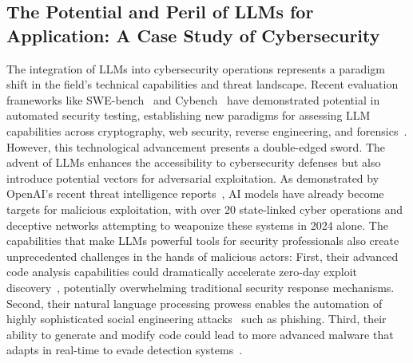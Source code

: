 \subsection{The Potential and Peril of LLMs for Application: A Case Study of Cybersecurity}
The integration of LLMs into cybersecurity operations represents a paradigm shift in the field's technical capabilities and threat landscape. Recent evaluation frameworks like SWE-bench~\cite{jimenez2024swebench} and Cybench~\cite{zhang2024cybench} have demonstrated potential in automated security testing, establishing new paradigms for assessing LLM capabilities across cryptography, web security, reverse engineering, and forensics~\cite{hu2020automated, yang2024whitefox, wang2024llmif, meng2024large, deng2023large, ma2024one, ullah2024llms, aicc2024}. However, this technological advancement presents a double-edged sword. The advent of LLMs enhances the accessibility to cybersecurity defenses but also introduce potential vectors for adversarial exploitation. As demonstrated by OpenAI's recent threat intelligence reports~\cite{openaicybersecurity}, AI models have already become targets for malicious exploitation, with over 20 state-linked cyber operations and deceptive networks attempting to weaponize these systems in 2024 alone. The capabilities that make LLMs powerful tools for security professionals also create unprecedented challenges in the hands of malicious actors: First, their advanced code analysis capabilities could dramatically accelerate zero-day exploit discovery~\cite{fang2024teams, shen2024pentestagent, ristea2024ai}, potentially overwhelming traditional security response mechanisms. Second, their natural language processing prowess enables the automation of highly sophisticated social engineering attacks~\cite{falade2023decoding, charfeddine2024chatgpt} such as phishing. Third, their ability to generate and modify code could lead to more advanced malware that adapts in real-time to evade detection systems~\cite{madani2023metamorphic, usman2024dark}.


